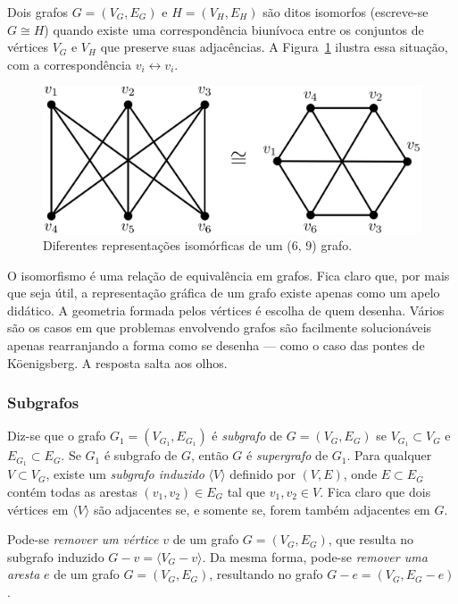 \documentclass[a4paper,12pt]{article}
\begin{document}
Dois grafos $G = (V_G, E_G)$ e $H = (V_H, E_H)$ são ditos isomorfos (escreve-se $G \cong H$) quando existe uma correspondência biunívoca entre os conjuntos de vértices $V_G$ e $V_H$ que preserve suas adjacências. A Figura~\ref{fig:graphisomorphic} ilustra essa situação, com a correspondência $v_i \longleftrightarrow v_i$.

\begin{figure}[H]
	\begin{center}
		\includegraphics[width=0.6\linewidth]{figures/graphisomorphic.png}
	\end{center}
	\caption{Diferentes representações isomórficas de um (6, 9) grafo.}
	\label{fig:graphisomorphic}
\end{figure}

O isomorfismo é uma relação de equivalência em grafos. Fica claro que, por mais que seja útil, a representação gráfica de um grafo existe apenas como um apelo didático. A geometria formada pelos vértices é escolha de quem desenha. Vários são os casos em que problemas envolvendo grafos são facilmente solucionáveis apenas rearranjando a forma como se desenha --- como o caso das pontes de Köenigsberg. A resposta salta aos olhos.

\subsubsection*{Subgrafos}

Diz-se que o grafo $G_1 = (V_{G_1}, E_{G_1})$ é \textit{subgrafo} de $G = (V_G, E_G)$ se $V_{G_1} \subset V_G$ e $E_{G_1} \subset E_G$. Se $G_1$ é subgrafo de $G$, então $G$ é \textit{supergrafo} de $G_1$. Para qualquer $V \subset V_G$, existe um \textit{subgrafo induzido} $\langle V \rangle$ definido por $(V, E)$, onde $E \subset E_G$ contém todas as arestas $(v_1, v_2) \in E_G$ tal que $v_1, v_2 \in V$. 
Fica claro que dois vértices em $\langle V \rangle$ são adjacentes se, e somente se, forem também adjacentes em $G$.

Pode-se \textit{remover um vértice} $v$ de um grafo $G = (V_G, E_G)$, que resulta no subgrafo induzido $G - v = \langle V_G- v\rangle$. Da mesma forma, pode-se \textit{remover uma aresta} $e$ de um grafo $G = (V_G, E_G)$, resultando no grafo $G-e = (V_G, E_G - e)$.
\end{document}
